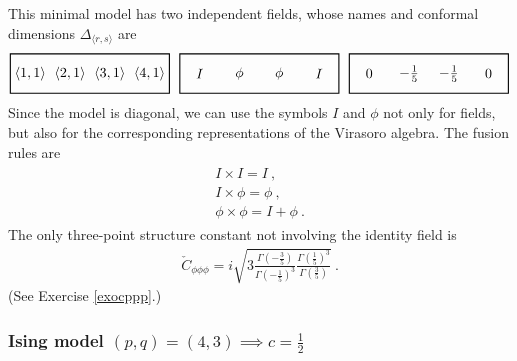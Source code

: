 \documentclass[12pt, a4paper, notitlepage, twoside]{report}
\numberwithin{equation}{section}
\theoremstyle{break}
\begin{document}
This minimal model has two independent fields, whose names and conformal dimensions $\Delta_{\langle r,s\rangle}$ are 
\begin{align}
 \begin{tikzpicture}[scale = .5, baseline=(current  bounding  box.center)]
  \draw[thick] (-1,-1) -- (-1, 1) -- (7, 1) -- (7, -1) -- cycle;
  \foreach \x in {1, ..., 4}{
  \node at ({2*(\x-1)}, 0) {$\langle \x,1\rangle $};
  }
 \end{tikzpicture}
 \ \ 
 \begin{tikzpicture}[scale = .5, baseline=(current  bounding  box.center)]
  \draw[thick] (-1,-1) -- (-1, 1) -- (7, 1) -- (7, -1) -- cycle;
  \node at (0, 0) {$I$};
  \node at (2, 0) {$\phi$};
  \node at (4, 0) {$\phi$};
  \node at (6, 0) {$I$};
  \end{tikzpicture}
  \ \ 
  \begin{tikzpicture}[scale = .5, baseline=(current  bounding  box.center)]
  \draw[thick] (-1,-1) -- (-1, 1) -- (7, 1) -- (7, -1) -- cycle;
  \node at (0, 0) {$0$};
  \node at (2, 0) {$-\frac15$};
  \node at (4, 0) {$-\frac15$};
  \node at (6, 0) {$0$};
  \end{tikzpicture}
\end{align}
Since the model is diagonal, we can use the symbols $I$ and $\phi$ not only for fields, but also for the corresponding representations of the Virasoro algebra.
The fusion rules are 
\begin{align}
 \begin{array}{l}
  I\times I = I \ ,
\\ I\times \phi= \phi\ ,
\\ \phi \times \phi = I + \phi\ .
 \end{array}
\end{align}
The only three-point structure constant not involving the identity field is 
\begin{align}
 \check{C}_{\phi\phi\phi} = i\sqrt{3\frac{\Gamma(-\frac35)}{\Gamma(-\frac15)^3} \frac{\Gamma(\frac15)^3}{\Gamma(\frac35)}}\ .
\label{cppp}
\end{align}
(See Exercise \ref{exocppp}.)

\subsubsection{\textbf{\boldmath Ising model} $(p,q)=(4,3) \implies c=\tfrac12$}
\end{document}
